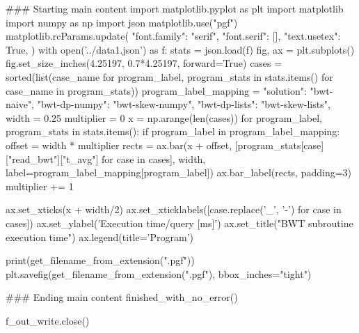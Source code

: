 ### Starting main content
import matplotlib.pyplot as plt
import matplotlib
import numpy as np
import json
matplotlib.use("pgf")
matplotlib.rcParams.update({
  "font.family": "serif",
  "font.serif": [],
  "text.usetex": True,
})
with open('../data1.json') as f:
    stats = json.load(f)
fig, ax = plt.subplots()
fig.set_size_inches(4.25197, 0.7*4.25197, forward=True)
cases = sorted(list({case_name for program_label, program_stats in stats.items() for case_name in program_stats}))
program_label_mapping = {
  "solution": "bwt-naive",
  "bwt-dp-numpy": "bwt-skew-numpy",
  "bwt-dp-lists": "bwt-skew-lists",
}
width = 0.25
multiplier = 0
x = np.arange(len(cases))
for program_label, program_stats in stats.items():
  if program_label in program_label_mapping:
    offset = width * multiplier
    rects = ax.bar(x + offset, [program_stats[case]["read_bwt"]["t_avg"] for case in cases], width, label=program_label_mapping[program_label])
    ax.bar_label(rects, padding=3)
    multiplier += 1

ax.set_xticks(x + width/2)
ax.set_xticklabels([case.replace('_', '-') for case in cases])
ax.set_ylabel('Execution time/query [ms]')
ax.set_title("BWT subroutine execution time")
ax.legend(title='Program')

print(get_filename_from_extension(".pgf"))
plt.savefig(get_filename_from_extension(".pgf"), bbox_inches="tight")




### Ending main content
finished_with_no_error()


f_out_write.close()




